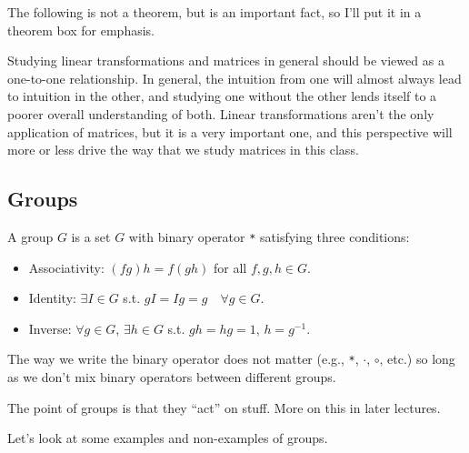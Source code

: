 The following is not a theorem, but is an important fact, so I'll put it in a theorem box for emphasis. 

\begin{theorem}
\thmlabel

Studying linear transformations and matrices in general should be viewed as a one-to-one relationship. In general, the intuition from one will almost always lead to intuition in the other, and studying one without the other lends itself to a poorer overall understanding of both. Linear transformations aren't the only application of matrices, but it is a very important one, and this perspective will more or less drive the way that we study matrices in this class. 
\end{theorem}

\subsection{Groups}

\begin{definition}

A \ac{group} $G$ is a set $G$ with binary operator \texttt{*} satisfying three conditions: 

\begin{itemize}
    \item Associativity: $(fg)h = f(gh)$ for all $f,g,h\in G$. 
    \item Identity: $\exists I\in G$ s.t. $gI = Ig = g\quad \forall g\in G$.
    \item Inverse: $\forall g\in G$, $\exists h\in G$ s.t. $gh=hg=1$, $h=g^{-1}$.
\end{itemize}
\end{definition}

The way we write the binary operator does not matter (e.g., \texttt{*}, $\cdot$, $\circ$, etc.) so long as we don't mix binary operators between different groups. 

The point of groups is that they ``act'' on stuff. More on this in later lectures. 

\begin{example}
\exlabel

Let's look at some examples and non-examples of groups.
\end{example}

